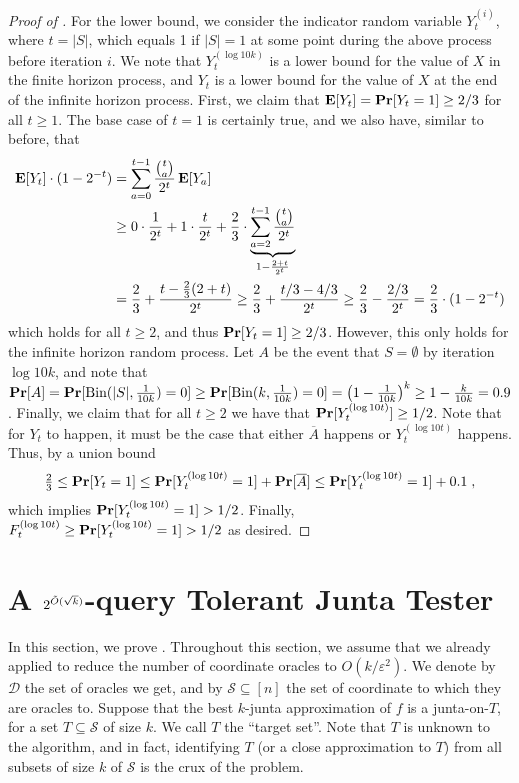 \documentclass[10pt,a4paper]{article}
\theoremstyle{plain}
\theoremstyle{remark}
\theoremstyle{plain}
\renewcommand{\Pr}{\mathop{\bf Pr\/}}
\providecommand{\E}{}
\renewcommand{\E}{\mathop{\bf E\/}}
\newcommand{\eps}{\varepsilon}
\newcommand{\calS}{\mathcal{S}}
\newcommand{\InfluentialCoords}{\calS}
\newcommand{\InfluentialOracles}{\mathcal{D}}
\newcommand{\Binomial}{\textrm{Bin}}
\begin{document}
\begin{proof}[Proof of ]
For the lower bound, we consider the indicator random variable $Y_t^{(i)}$, where $t = |S|$, which equals 1 if $|S|=1$ at some point during the above process before iteration $i$. We note that $Y_t^{(\log 10k)}$ is a lower bound for the value of $X$ in the finite horizon process, and $Y_t$ is a lower bound for the value of $X$ at the end of the infinite horizon process. First, we claim that $\E[Y_t] = \Pr[Y_t = 1] \geq 2/3$ for all $t \geq 1$. The base case of $t=1$ is certainly true, and we also have, similar to before, that
\begin{align*}
    \E[Y_t]\cdot (1-2^{-t}) &= \sum_{a=0}^{t-1} \frac{\binom{t}{a}}{2^t}\E[Y_a] \\
    &\ge 0\cdot \frac{1}{2^t} + 1\cdot\frac{t}{2^t} +\frac{2}{3}\cdot \underbrace{\sum_{a=2}^{t-1} \frac{\binom{t}{a}}{2^t}}_{1 - \frac{2+t}{2^t}} \\
    &= \frac{2}{3} + \frac{t - \frac{2}{3}(2+t)}{2^t} \geq \frac{2}{3} + \frac{t/3 - 4/3}{2^t} \ge \frac{2}{3} - \frac{2/3}{2^t} = \frac{2}{3} \cdot (1-2^{-t})
    \end{align*}
which holds for all $t \geq 2$, and thus $\Pr[Y_t = 1] \geq 2/3$. However, this only holds for the infinite horizon random process. Let $A$ be the event that $S = \emptyset$ by iteration $\log 10k$, and note that $\Pr[A] = \Pr[\Binomial(|S|, \frac{1}{10k}) = 0] \geq \Pr[\Binomial(k, \frac{1}{10k}) = 0]  = \left( 1-\frac{1}{10k}\right )^{k}  \geq 1-\frac{k}{10k} = 0.9$. Finally, we claim that for all $t\geq 2$ we have that $\Pr[Y_t^{(\log 10t)}]\geq 1/2$. Note that for $Y_t$ to happen, it must be the case that either $\overline{A}$ happens or $Y_t^{(\log 10t)}$ happens. Thus, by a union bound
\begin{align*}
\tfrac{2}{3} \le \Pr[Y_t = 1] \le 
    \Pr[Y_t^{(\log 10t)}=1]  + \Pr[\overline{A}] \le     \Pr[Y_t^{(\log 10t)}=1] + 0.1\;,
\end{align*}
which  implies  $\Pr[Y_t^{(\log 10t)}=1] >1/2$. Finally, $F_t^{(\log 10t)} \geq \Pr[Y_t^{(\log 10t)}=1] > 1/2$ as desired.
\end{proof}

\section{A $2^{\Tilde{O}(\sqrt{k})}$-query Tolerant Junta Tester}
\label{section:main-result}

In this section, we prove . Throughout this section, we  assume that we already applied  to reduce the number of coordinate oracles to $O(k/\eps^2)$. We denote by $\InfluentialOracles$ the set of oracles we get, and by $\InfluentialCoords \subseteq [n]$ the set of coordinate to which they are oracles to.
Suppose that the best $k$-junta approximation of $f$ is a junta-on-$T$, for a 
set $T \subseteq \InfluentialCoords$  of size $k$. We call $T$ the ``target set''. Note that $T$ is unknown to the algorithm, and in fact, identifying $T$ (or a close approximation to $T$) from all subsets of  size $k$ of $\InfluentialCoords$ is the crux of the problem.
\end{document}
